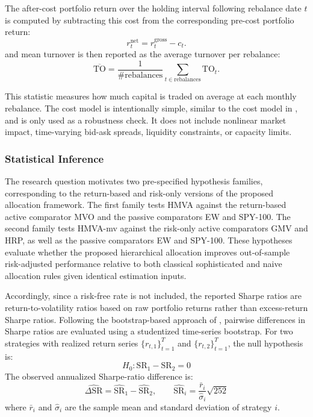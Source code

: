 \documentclass[12pt]{article}
\begin{document}
The after-cost portfolio return over the holding interval following rebalance date $t$ is computed by subtracting this cost from the corresponding pre-cost portfolio return:
\begin{equation}
r^{\mathrm{net}}_{t}
=
r^{\mathrm{gross}}_{t}
-
c_t .
\label{eq:net_return_design}
\end{equation}
and mean turnover is then reported as the average turnover per rebalance:
\begin{equation}
\overline{\mathrm{TO}}
=
\frac{1}{\# \text{rebalances}}
\sum_{t \in \text{rebalances}}
\mathrm{TO}_t.
\label{eq:mean_turnover_design}
\end{equation}

This statistic measures how much capital is traded on average at each monthly rebalance. The cost model is intentionally simple, similar to the cost model in \cite{lobofazelboyd2007}, and is only used as a robustness check. It does not include nonlinear market impact, time-varying bid-ask spreads, liquidity constraints, or capacity limits.

\subsubsection{Statistical Inference}
\label{inf_stats}
The research question motivates two pre-specified hypothesis families, corresponding to the return-based and risk-only versions of the proposed allocation framework. The first family tests HMVA against the return-based active comparator MVO and the passive comparators EW and SPY-100. The second family tests HMVA-mv against the risk-only active comparators GMV and HRP, as well as the passive comparators EW and SPY-100. These hypotheses evaluate whether the proposed hierarchical allocation improves out-of-sample risk-adjusted performance relative to both classical sophisticated and naive allocation rules given identical estimation inputs. 

Accordingly, since a risk-free rate is not included, the reported Sharpe ratios are return-to-volatility ratios based on raw portfolio returns rather than excess-return Sharpe ratios. Following the bootstrap-based approach of \cite{ledoitwolf2008}, pairwise differences in Sharpe ratios are evaluated using a studentized time-series bootstrap. For two strategies with realized return series $\{r_{t,1}\}_{t=1}^{T}$ and $\{r_{t,2}\}_{t=1}^{T}$, the null hypothesis is:
\begin{equation}
    H_0:\mathrm{SR}_1-\mathrm{SR}_2=0
\end{equation}
The observed annualized Sharpe-ratio difference is:
\begin{equation}
\widehat{\Delta \mathrm{SR}}
=
\widehat{\mathrm{SR}}_1-\widehat{\mathrm{SR}}_2,
\qquad
\widehat{\mathrm{SR}}_i
=
\frac{\bar r_i}{\hat \sigma_i}\sqrt{252}
\label{eq:LW_Sharpe_diff}
\end{equation}
where $\bar r_i$ and $\hat\sigma_i$ are the sample mean and standard deviation of strategy $i$.
\end{document}
